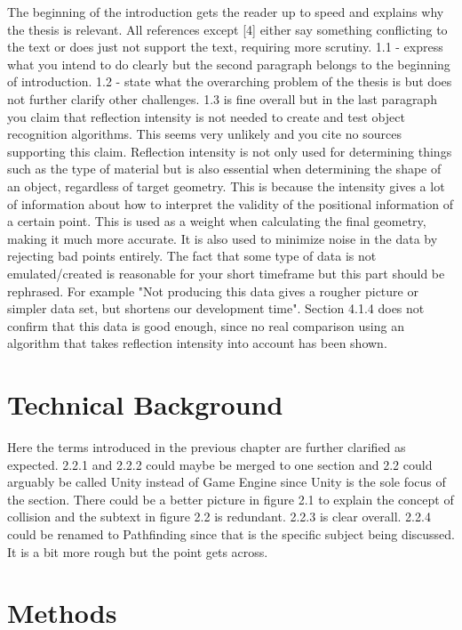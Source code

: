 \documentclass[12pt,a4paper,twoside,openright]{report}
\begin{document}
	The beginning of the introduction gets the reader up to speed and explains
	why the thesis is relevant. All references except [4] either say something
	conflicting to the text or does just not support the text, requiring more 
	scrutiny. 1.1 - express what you intend to do clearly but the second 
	paragraph belongs to the beginning of introduction. 1.2 - state what the
	overarching problem of the thesis is but does not further clarify other
	challenges. 1.3 is fine overall but in the last paragraph you claim that
	reflection intensity is not needed to create and test object recognition
	algorithms. This seems very unlikely and you cite no sources supporting this
	claim. Reflection intensity is not only used for determining things such as
	the type of material but is also essential when determining the shape of an
	object, regardless of target geometry. This is because the intensity gives a
	lot of information about how to interpret the validity of the positional
	information of a certain point. This is used as a weight when calculating
	the final geometry, making it much more accurate. It is also used to
	minimize noise in the data by rejecting bad points entirely. The fact that
	some type of data is not emulated/created is reasonable for your short
	timeframe but this part should be rephrased. For example "Not producing this
	data gives a rougher picture or simpler data set, but shortens our 
	development time". Section 4.1.4 does not confirm that this data is good 
	enough, since no real comparison using an algorithm that takes reflection 
	intensity into account has been shown. 

\section*{Technical Background}

	Here the terms introduced in the previous chapter are further clarified as
	expected. 2.2.1 and 2.2.2 could maybe be merged to one section and 2.2
	could arguably be called Unity instead of Game Engine since Unity is the
	sole focus of the section. There could be a better picture in figure 2.1 to
	explain the concept of collision and the subtext in figure 2.2 is
	redundant. 2.2.3 is clear overall. 2.2.4 could be renamed to Pathfinding
	since that is the specific subject being discussed. It is a bit more rough
	but the point gets across.

\section*{Methods}
\end{document}
